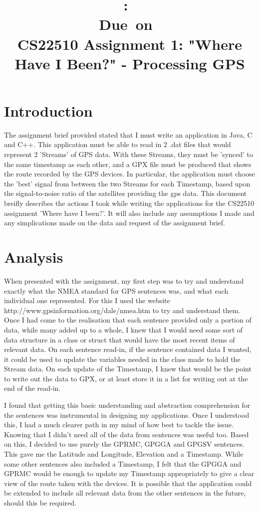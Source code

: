 \documentclass{article}
\title{
\vspace{2in}
\textmd{\textbf{\hmwkClass:\ \hmwkTitle}}\\
\normalsize\vspace{0.1in}\small{Due\ on\ \hmwkDueDate}\\
\vspace{3in}
}
\author{\textbf{\hmwkAuthorName}}
\date{} %
\begin{document}
\title{CS22510 Assignment 1: "Where Have I Been?" - Processing GPS}
\maketitle

\section{Introduction}

The assignment brief provided stated that I must write an application in Java, C and C++. This application must be able to read in 2 .dat files that would represent 2 'Streams' of GPS data. With these Streams, they must be 'synced' to the same timestamp as each other, and a GPX file must be produced that shows the route recorded by the GPS devices. In particular, the application must choose the 'best' signal from between the two Streams for each Timestamp, based upon the signal-to-noise ratio of the satellites providing the gps data. This document breifly describes the actions I took while writing the applications for the CS22510 assignment 'Where have I been?'. It will also include any assumptions I made and any simplications made on the data and request of the assignment brief.

\section{Analysis}

When presented with the assignment, my first step was to try and understand exactly what the NMEA standard for GPS sentences was, and what each individual one represented. For this I used the website http://www.gpsinformation.org/dale/nmea.htm to try and understand them. Once I had come to the realisation that each sentence provided only a portion of data, while many added up to a whole, I knew that I would need some sort of data structure in a class or struct that would have the most recent items of relevant data. On each sentence read-in, if the sentence contained data I wanted, it could be used to update the variables needed in the class made to hold the Stream data. On each update of the Timestamp, I knew that would be the point to write out the data to GPX, or at least store it in a list for writing out at the end of the read-in.

I found that getting this basic understanding and abstraction comprehension for the sentences was instrumental in designing my applications. Once I understood this, I had a much clearer path in my mind of how best to tackle the issue. Knowing that I didn't need all of the data from sentences was useful too. Based on this, I decided to use purely the GPRMC, GPGGA and GPGSV sentences. This gave me the Latitude and Longitude, Elevation and a Timestamp. While some other sentences also included a Timestamp, I felt that the GPGGA and GPRMC would be enough to update my Timestamp appropriately to give a clear view of the route taken with the devices. It is possible that the application could be extended to include all relevant data from the other sentences in the future, should this be required.
\end{document}
